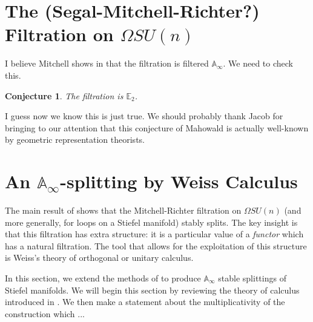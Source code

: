 \documentclass[reqno, oneside]{amsart}
\theoremstyle{definition}
\theoremstyle{plain}
\newtheorem{cnj}[nul]{Conjecture}
\begin{document}
\section{The (Segal-Mitchell-Richter?) Filtration on \texorpdfstring{$\Omega SU(n)$}{Loops SU(n)}}

I believe Mitchell shows in \cite{MitchellSU(n)} that the filtration is filtered $\mathbb{A}_\infty$.  We need to check this.

\begin{cnj} The filtration is $\mathbb{E}_2$.
\end{cnj}
I guess now we know this is just true.  We should probably thank Jacob for bringing to our attention that this conjecture of Mahowald is actually well-known by geometric representation theorists.  

\section{An \texorpdfstring{$\mathbb{A}_\infty$}{Aoo}-splitting by Weiss Calculus} \label{sec:AooSplit}

The main result of \cite{Arone} shows that the Mitchell-Richter filtration on $\Omega SU(n)$ (and more generally, for loops on a Stiefel manifold) stably splits.  The key insight is that this filtration has extra structure: it is a particular value of a \emph{functor} which has a natural filtration.  The tool that allows for the exploitation of this structure is Weiss's theory of orthogonal or unitary calculus.  

In this section, we extend the methods of \cite{Arone} to produce $\mathbb{A}_\infty$ stable splittings of Stiefel manifolds.  We will begin this section by reviewing the theory of calculus introduced in \cite{Weiss}.  We then make a statement about the multiplicativity of the construction which ...%
\end{document}
